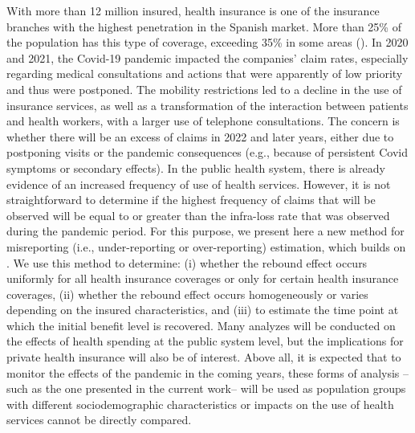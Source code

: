 \documentclass[Afour,sageh,times]{sagej}
\begin{document}
With more than 12 million insured, health insurance is one of the insurance branches with the highest penetration in the Spanish market. More than 25\% of the population has this type of coverage, exceeding 35\% in some areas (\cite{unespa_informe_2020}). In 2020 and 2021, the Covid-19 pandemic impacted the companies' claim rates, especially regarding medical consultations and actions that were apparently of low priority and thus were postponed. The mobility restrictions led to a decline in the use of insurance services, as well as a transformation of the interaction between patients and health workers, with a larger use of telephone consultations. The concern is whether there will be an excess of claims in 2022 and later years, either due to postponing visits or the pandemic consequences (e.g., because of persistent Covid symptoms or secondary effects). In the public health system, there is already evidence of an increased frequency of use of health services. However, it is not straightforward to determine if the highest frequency of claims that will be observed will be equal to or greater than the infra-loss rate that was observed during the pandemic period. For this purpose, we present here a new method for misreporting (i.e., under-reporting or over-reporting) estimation, which builds on \cite{fernandez-fontelo_a_cabana_a_puig_p_and_morina_d_under-reported_2016, fernandezfontelo_a_cabana_a_joe_h_puig_p_and_morina_d_untangling_2019}. We use this method to determine: (i) whether the rebound effect occurs uniformly for all health insurance coverages or only for certain health insurance coverages, (ii) whether the rebound effect occurs homogeneously or varies depending on the insured characteristics, and (iii) to estimate the time point at which the initial benefit level is recovered. Many analyzes will be conducted on the effects of health spending at the public system level, but the implications for private health insurance will also be of interest. Above all, it is expected that to monitor the effects of the pandemic in the coming years, these forms of analysis --such as the one presented in the current work-- will be used as population groups with different sociodemographic characteristics or impacts on the use of health services cannot be directly compared. 
\end{document}
